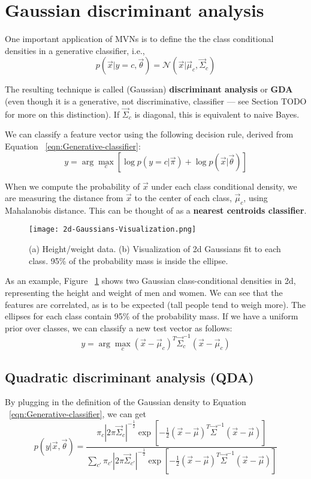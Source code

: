 \section{Gaussian discriminant analysis}
One important application of MVNs is to define the the class conditional densities in a generative classifier, i.e.,
\begin{equation}
p(\vec{x}|y=c,\vec{\theta})=\mathcal{N}(\vec{x}|\vec{\mu}_c,\vec{\Sigma}_c)
\end{equation}

The resulting technique is called (Gaussian) \textbf{discriminant analysis} or \textbf{GDA} (even though it is a generative, not discriminative, classifier — see Section TODO for more on this distinction). If $\vec{\Sigma}_c$ is diagonal, this is equivalent to naive Bayes.

We can classify a feature vector using the following decision rule, derived from Equation ~\eqref{eqn:Generative-classifier}:
\begin{equation}
y=\arg\max_{c} \left[\log p(y=c|\vec{\pi})+\log p(\vec{x}|\vec{\theta})\right]
\end{equation}

When we compute the probability of $\vec{x}$ under each class conditional density, we are measuring the distance from $\vec{x}$ to the center of each class, $\vec{\mu}_c$, using Mahalanobis distance. This can be thought of as a \textbf{nearest centroids classifier}.

\begin{figure}[hbtp]
\centering
    \texttt{[image: 2d-Gaussians-Visualization.png]}
\caption{(a) Height/weight data. (b) Visualization of 2d Gaussians fit to each class. 95\% of the probability mass is inside the ellipse.}
\label{fig:2d-Gaussians-Visualization} 
\end{figure}

As an example, Figure ~\ref{fig:2d-Gaussians-Visualization} shows two Gaussian class-conditional densities in 2d, representing the height and weight of men and women. We can see that the features are correlated, as is to be expected (tall people tend to weigh more). The ellipses for each class contain 95\% of the probability mass. If we have a uniform prior over classes, we can classify a new test vector as follows:
\begin{equation}
y=\arg\max_{c} (\vec{x}-\vec{\mu}_c)^T\vec{\Sigma}_c^{-1}(\vec{x}-\vec{\mu}_c)
\end{equation}


\subsection{Quadratic discriminant analysis (QDA)}
By plugging in the definition of the Gaussian density to Equation ~\eqref{eqn:Generative-classifier}, we can get
\begin{equation}\label{eqn:QDA}
p(y|\vec{x},\vec{\theta})=\dfrac{\pi_c|2\pi\vec{\Sigma}_c|^{-\frac{1}{2}}\exp\left[-\frac{1}{2}(\vec{x}-\vec{\mu})^T\vec{\Sigma}^{-1}(\vec{x}-\vec{\mu})\right]}{\sum_{c'}\pi_{c'}|2\pi\vec{\Sigma}_{c'}|^{-\frac{1}{2}}\exp\left[-\frac{1}{2}(\vec{x}-\vec{\mu})^T\vec{\Sigma}^{-1}(\vec{x}-\vec{\mu})\right]}
\end{equation}

